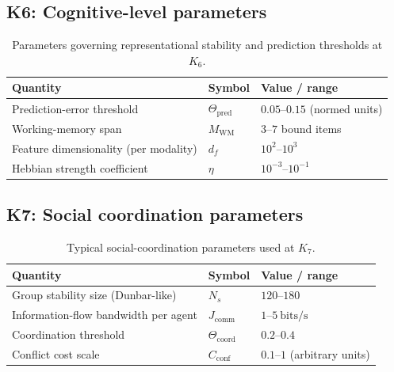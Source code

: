 
\subsection*{K6: Cognitive-level parameters}

\begin{table}[h]
  \centering
  \caption{Parameters governing representational stability and prediction thresholds at \(K_6\).}
  \label{tab:k6-cognitive-parameters}
  \begin{tabular}{lll}
    \hline
    Quantity & Symbol & Value / range \\
    \hline
    Prediction-error threshold & \(\Theta_{\mathrm{pred}}\)
        & \(0.05\text{–}0.15\) (normed units) \\
    Working-memory span & \(M_\mathrm{WM}\)
        & \(3\text{–}7\) bound items \\
    Feature dimensionality (per modality) 
        & \(d_f\)
        & \(10^2\text{–}10^3\) \\
    Hebbian strength coefficient & \(\eta\)
        & \(10^{-3}\text{–}10^{-1}\) \\
    \hline
  \end{tabular}
\end{table}


\subsection*{K7: Social coordination parameters}

\begin{table}[h]
  \centering
  \caption{Typical social-coordination parameters used at \(K_7\).}
  \label{tab:k7-social-parameters}
  \begin{tabular}{lll}
    \hline
    Quantity & Symbol & Value / range \\
    \hline
    Group stability size (Dunbar-like) & \(N_s\)
        & \(120\text{–}180\) \\
    Information-flow bandwidth per agent & \(J_\mathrm{comm}\)
        & \(1\text{–}5~\mathrm{bits/s}\) \\
    Coordination threshold & \(\Theta_{\mathrm{coord}}\)
        & \(0.2\text{–}0.4\) \\
    Conflict cost scale & \(C_\mathrm{conf}\)
        & \(0.1\text{–}1\) (arbitrary units) \\
    \hline
  \end{tabular}
\end{table}

